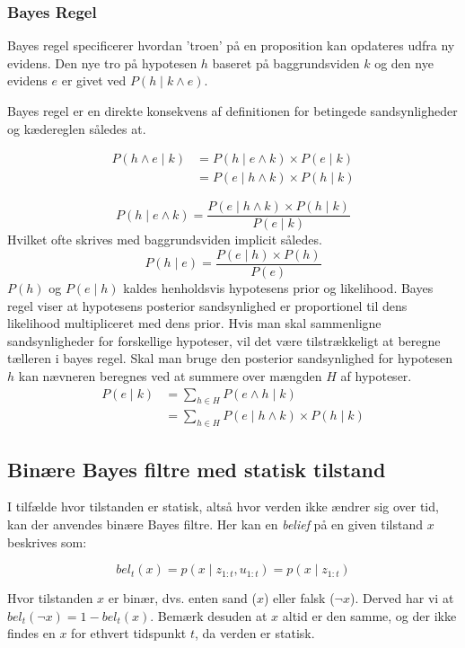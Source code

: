\cite[s. 227]{ArtificialIntelligence}

\subsubsection{Bayes Regel}

Bayes regel specificerer hvordan 'troen' på en proposition kan opdateres udfra ny evidens.
Den nye tro på hypotesen $h$ baseret på baggrundsviden $k$ og den nye evidens $e$ er givet ved $P(h \mid k \wedge e)$.

Bayes regel er en direkte konsekvens af definitionen for betingede sandsynligheder og kædereglen således at. 

\begin{align}
P(h \wedge e \mid k) &= P(h \mid e \wedge k) \times P(e \mid k) \\
&= P(e \mid h \wedge k) \times P(h \mid k)
\end{align}

$$P(h \mid e \wedge k) = \frac{P(e \mid h \wedge k) \times P(h \mid k)}{P(e \mid k)}$$
Hvilket ofte skrives med baggrundsviden implicit således.
$$P(h \mid e) = \frac{P(e \mid h) \times P(h)}{P(e)}$$
$P(h)$ og $P(e \mid h)$ kaldes henholdsvis hypotesens prior og likelihood.
Bayes regel viser at hypotesens posterior sandsynlighed er proportionel til dens likelihood multipliceret med dens prior.
Hvis man skal sammenligne sandsynligheder for forskellige hypoteser, vil det være tilstrækkeligt at beregne tælleren i bayes regel.
Skal man bruge den posterior sandsynlighed for hypotesen $h$ kan nævneren beregnes ved at summere over mængden $H$ af hypoteser.
\begin{align}
	P(e \mid k) &= \sum_{h \in H} P(e \wedge h \mid k) \\
	&= \sum_{h \in H}P(e \mid h \wedge k) \times P(h \mid k)
\end{align}
\cite[s. 229]{ArtificialIntelligence}

\subsection{Binære Bayes filtre med statisk tilstand}\label{bayes_binaerfiltre}
I tilfælde hvor tilstanden er statisk, altså hvor verden ikke ændrer sig over tid, kan der anvendes binære Bayes filtre.
Her kan en \textit{belief} på en given tilstand $x$ beskrives som:

$$bel_t(x) = p(x \mid z_{1:t},u_{1:t}) = p(x \mid z_{1:t})$$

Hvor tilstanden $x$ er binær, dvs. enten sand ($x$) eller falsk ($\lnot x$).
Derved har vi at $bel_t(\lnot x) = 1 - bel_t(x)$.
Bemærk desuden at $x$ altid er den samme, og der ikke findes en $x$ for ethvert tidspunkt $t$, da verden er statisk. \\ \\
\cite[s. 94]{probabilisticRobotics}

